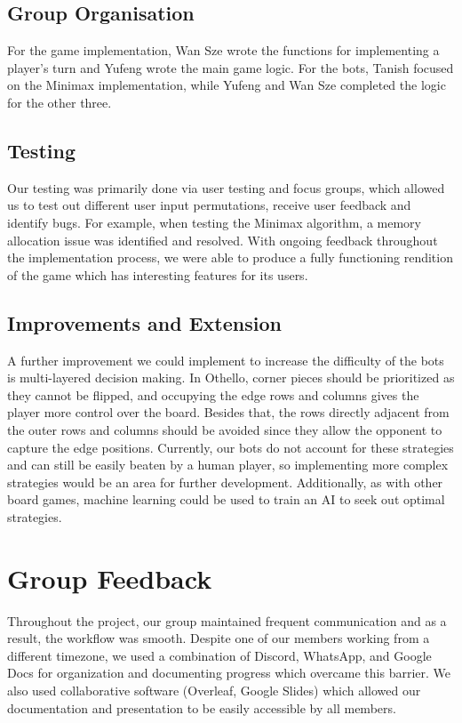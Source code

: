 \documentclass[a4paper,11pt]{article}
\begin{document}
\subsection{Group Organisation}
For the game implementation, Wan Sze wrote the functions for implementing a player's turn and Yufeng wrote the main game logic. For the bots, Tanish focused on the Minimax implementation, while Yufeng and Wan Sze completed the logic for the other three.

\subsection{Testing}
Our testing was primarily done via user testing and focus groups, which allowed us to test out different user input permutations, receive user feedback and identify bugs. For example, when testing the Minimax algorithm, a memory allocation issue was identified and resolved. With ongoing feedback throughout the implementation process, we were able to produce a fully functioning rendition of the game which has interesting features for its users.

\subsection{Improvements and Extension}
A further improvement we could implement to increase the difficulty of the bots is multi-layered decision making. In Othello, corner pieces should be prioritized as they cannot be flipped, and occupying the edge rows and columns gives the player more control over the board. Besides that, the rows directly adjacent from the outer rows and columns should be avoided since they allow the opponent to capture the edge positions. Currently, our bots do not account for these strategies and can still be easily beaten by a human player, so implementing more complex strategies would be an area for further development. Additionally, as with other board games, machine learning could be used to train an AI to seek out optimal strategies.

\section{Group Feedback}
Throughout the project, our group maintained frequent communication and as a result, the workflow was smooth. Despite one of our members working from a different timezone, we used a combination of Discord, WhatsApp, and Google Docs for organization and documenting progress which overcame this barrier. We also used collaborative software (Overleaf, Google Slides) which allowed our documentation and presentation to be easily accessible by all members. \newline
\end{document}
